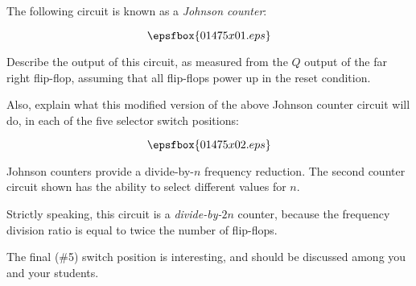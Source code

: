 

The following circuit is known as a {\it Johnson counter}:

$$\epsfbox{01475x01.eps}$$

Describe the output of this circuit, as measured from the $Q$ output of the far right flip-flop, assuming that all flip-flops power up in the reset condition.

\vskip 10pt

Also, explain what this modified version of the above Johnson counter circuit will do, in each of the five selector switch positions:

$$\epsfbox{01475x02.eps}$$







Johnson counters provide a divide-by-$n$ frequency reduction.  The second counter circuit shown has the ability to select different values for $n$.







Strictly speaking, this circuit is a {\it divide-by-}$2n$ counter, because the frequency division ratio is equal to twice the number of flip-flops.

The final (\#5) switch position is interesting, and should be discussed among you and your students.




